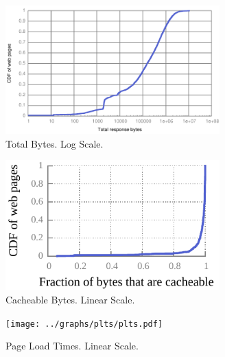 
\begin{figure}[t]
    \includegraphics[width=3.25in]{../graphs/total_bytes/total_bytes.pdf}
    \caption[]{\label{fig:total_bytes} Total Bytes. Log Scale.}
\end{figure}


\begin{figure}[t]
    \includegraphics[width=3.25in]{../graphs/cacheable_bytes/cacheable_bytes_linear.pdf}
    \caption[]{\label{fig:cacheable_bytes_linear} Cacheable Bytes. Linear
    Scale.}
\end{figure}

\begin{figure}[t]
    \texttt{[image: ../graphs/plts/plts.pdf]}
    \caption[]{\label{fig:plts} Page Load Times. Linear
    Scale.}
\end{figure}


